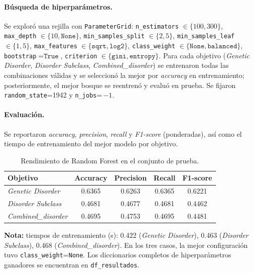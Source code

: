 \documentclass[11pt,a4paper,spanish]{book}
\numberwithin{equation}{chapter}
\numberwithin{figure}{chapter}
\begin{document}
\paragraph{Búsqueda de hiperparámetros.}
Se exploró una rejilla con \texttt{ParameterGrid}:
\texttt{n\_estimators} $\in\{100,300\}$,
\texttt{max\_depth} $\in\{10,\texttt{None}\}$,
\texttt{min\_samples\_split} $\in\{2,5\}$,
\texttt{min\_samples\_leaf} $\in\{1,5\}$,
\texttt{max\_features} $\in\{\texttt{sqrt},\texttt{log2}\}$,
\texttt{class\_weight} $\in\{\texttt{None},\texttt{balanced}\}$,
\texttt{bootstrap}$=\texttt{True}$,
\texttt{criterion} $\in\{\texttt{gini},\texttt{entropy}\}$.
Para cada objetivo (\textit{Genetic Disorder}, \textit{Disorder Subclass}, \textit{Combined\_disorder})
se entrenaron todas las combinaciones válidas y se seleccionó la mejor por \textit{accuracy}
en entrenamiento; posteriormente, el mejor bosque se reentrenó y evaluó en prueba.
Se fijaron \texttt{random\_state}=1942 y \texttt{n\_jobs}=\,$-1$.

\paragraph{Evaluación.}
Se reportaron \textit{accuracy}, \textit{precision}, \textit{recall} y \textit{F1-score} (ponderadas),
así como el tiempo de entrenamiento del mejor modelo por objetivo.

\begin{table}[H]
\centering
\caption{Rendimiento de Random Forest en el conjunto de prueba.}
\label{tab:rf-resultados}
\begin{tabular}{lcccc}
\toprule
\textbf{Objetivo} & \textbf{Accuracy} & \textbf{Precision} & \textbf{Recall} & \textbf{F1-score} \\
\midrule
\textit{Genetic Disorder}      & 0.6365 & 0.6263 & 0.6365 & 0.6221 \\
\textit{Disorder Subclass}     & 0.4681 & 0.4677 & 0.4681 & 0.4462 \\
\textit{Combined\_disorder}    & 0.4695 & 0.4753 & 0.4695 & 0.4481 \\
\bottomrule
\end{tabular}

\vspace{0.5em}
\footnotesize
\textbf{Nota:} tiempos de entrenamiento (s): 0.422 (\textit{Genetic Disorder}),
0.463 (\textit{Disorder Subclass}), 0.468 (\textit{Combined\_disorder}).
En los tres casos, la mejor configuración tuvo \texttt{class\_weight}=\texttt{None}.
Los diccionarios completos de hiperparámetros ganadores se encuentran en \texttt{df\_resultados}.
\end{table}
\end{document}
